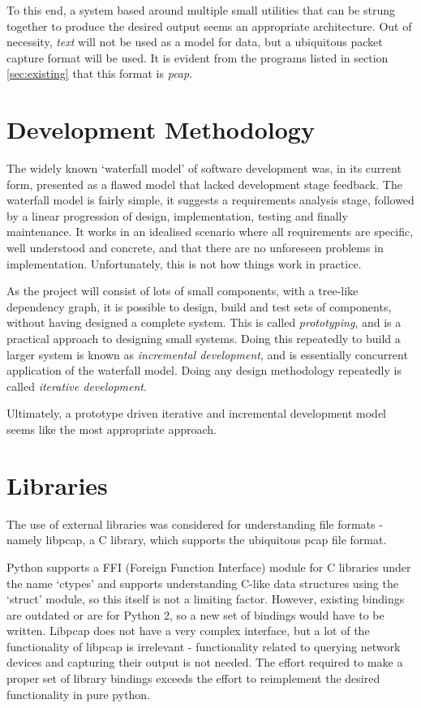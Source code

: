 \documentclass[10pt,a4paper,notitlepage,twoside]{report}
\begin{document}
To this end, a system based around multiple small utilities that can be strung together to produce the desired output seems an appropriate architecture. Out of necessity, \emph{text} will not be used as a model for data, but a ubiquitous packet capture format will be used. It is evident from the programs listed in section \ref{sec:existing} that this format is \emph{pcap}.

\section{Development Methodology}
The widely known `waterfall model' of software development was, in its current form, presented as a flawed model that lacked development stage feedback\cite{wwr-waterfall-notes}. The waterfall model is fairly simple, it suggests a requirements analysis stage, followed by a linear progression of design, implementation, testing and finally maintenance. It works in an idealised scenario where all requirements are specific, well understood and concrete, and that there are no unforeseen problems in implementation. Unfortunately, this is not how things work in practice.

As the project will consist of lots of small components, with a tree-like dependency graph, it is possible to design, build and test sets of components, without having designed a complete system. This is called \emph{prototyping}, and is a practical approach to designing small systems.
Doing this repeatedly to build a larger system is known as \emph{incremental development}, and is essentially concurrent application of the waterfall model. Doing any design methodology repeatedly is called \emph{iterative development}.

Ultimately, a prototype driven iterative and incremental development model seems like the most appropriate approach.

\section{Libraries}
The use of external libraries was considered for understanding file formats - namely libpcap, a C library, which supports the ubiquitous pcap file format.

Python supports a FFI (Foreign Function Interface) module for C libraries under the name `ctypes' and supports understanding C-like data structures using the `struct' module, so this itself is not a limiting factor.
However, existing bindings are outdated or are for Python 2, so a new set of bindings would have to be written. Libpcap does not have a very complex interface, but a lot of the functionality of libpcap is irrelevant - functionality related to querying network devices and capturing their output is not needed. The effort required to make a proper set of library bindings exceeds the effort to reimplement the desired functionality in pure python.
\end{document}
